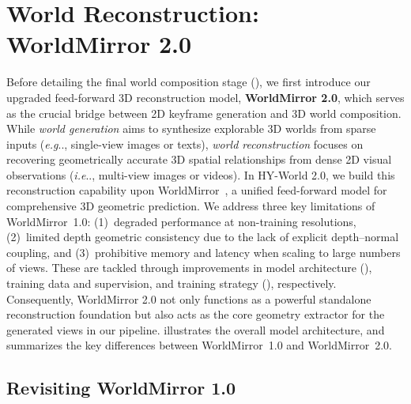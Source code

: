 \documentclass{article} %
\makeatletter
\DeclareRobustCommand\onedot{\futurelet\@let@token\@onedot}
\def\@onedot{\ifx\@let@token.\else.\null\fi\xspace}
\def\eg{\emph{e.g}\onedot} \def\Eg{\emph{E.g}\onedot}
\def\ie{\emph{i.e}\onedot} \def\Ie{\emph{I.e}\onedot}
\makeatother
\begin{document}
\section{World Reconstruction: WorldMirror 2.0}
\label{sec:world_recon}

Before detailing the final world composition stage (), we first introduce our upgraded feed-forward 3D reconstruction model, \textbf{WorldMirror 2.0}, which serves as the crucial bridge between 2D keyframe generation and 3D world composition.
While \emph{world generation} aims to synthesize explorable 3D worlds from sparse inputs (\eg, single-view images or texts), \emph{world reconstruction} focuses on recovering geometrically accurate 3D spatial relationships from dense 2D visual observations (\ie, multi-view images or videos). 
In HY-World 2.0, we build this reconstruction capability upon WorldMirror~\cite{liu2025worldmirror}, a unified feed-forward model for comprehensive 3D geometric prediction. We address three key limitations of WorldMirror~1.0: (1)~degraded performance at non-training resolutions, (2)~limited depth geometric consistency due to the lack of explicit depth--normal coupling, and (3)~prohibitive memory and latency when scaling to large numbers of views. These are tackled through improvements in model architecture (), training data and supervision, and training strategy (), respectively. Consequently, WorldMirror 2.0 not only functions as a powerful standalone reconstruction foundation but also acts as the core geometry extractor for the generated views in our pipeline.  illustrates the overall model architecture, and  summarizes the key differences between WorldMirror~1.0 and WorldMirror~2.0.



 



\subsection{Revisiting WorldMirror 1.0}
\label{sec:worldmirror_revisit}
\end{document}
